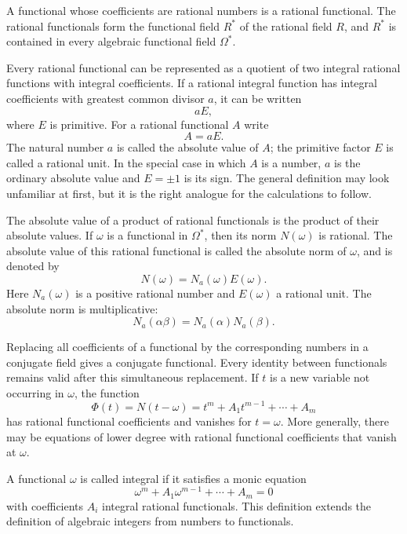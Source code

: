 \documentclass[11pt,a4paper]{book}
\begin{document}
A functional whose coefficients are rational numbers is a rational functional.  The rational functionals form the functional field \(R^*\) of the rational field \(R\), and \(R^*\) is contained in every algebraic functional field \(\Omega^*\).

Every rational functional can be represented as a quotient of two integral rational functions with integral coefficients.  If a rational integral function has integral coefficients with greatest common divisor \(a\), it can be written
\[
 aE,
\]
where \(E\) is primitive.  For a rational functional \(A\) write
\begin{equation}
 A=aE. \tag{1}
\end{equation}
The natural number \(a\) is called the absolute value of \(A\); the primitive factor \(E\) is called a rational unit.  In the special case in which \(A\) is a number, \(a\) is the ordinary absolute value and \(E=\pm1\) is its sign.  The general definition may look unfamiliar at first, but it is the right analogue for the calculations to follow.

The absolute value of a product of rational functionals is the product of their absolute values.  If \(\omega\) is a functional in \(\Omega^*\), then its norm \(N(\omega)\) is rational.  The absolute value of this rational functional is called the absolute norm of \(\omega\), and is denoted by
\begin{equation}
 N(\omega)=N_a(\omega)E(\omega). \tag{2}
\end{equation}
Here \(N_a(\omega)\) is a positive rational number and \(E(\omega)\) a rational unit.  The absolute norm is multiplicative:
\begin{equation}
 N_a(\alpha\beta)=N_a(\alpha)N_a(\beta). \tag{3}
\end{equation}

Replacing all coefficients of a functional by the corresponding numbers in a conjugate field gives a conjugate functional.  Every identity between functionals remains valid after this simultaneous replacement.  If \(t\) is a new variable not occurring in \(\omega\), the function
\begin{equation}
 \Phi(t)=N(t-
\omega)=t^m+A_1t^{m-1}+\cdots+A_m \tag{4}
\end{equation}
has rational functional coefficients and vanishes for \(t=\omega\).  More generally, there may be equations of lower degree with rational functional coefficients that vanish at \(\omega\).

A functional \(\omega\) is called integral if it satisfies a monic equation
\begin{equation}
 \omega^m+A_1\omega^{m-1}+\cdots+A_m=0 \tag{5}
\end{equation}
with coefficients \(A_i\) integral rational functionals.  This definition extends the definition of algebraic integers from numbers to functionals.
\end{document}
